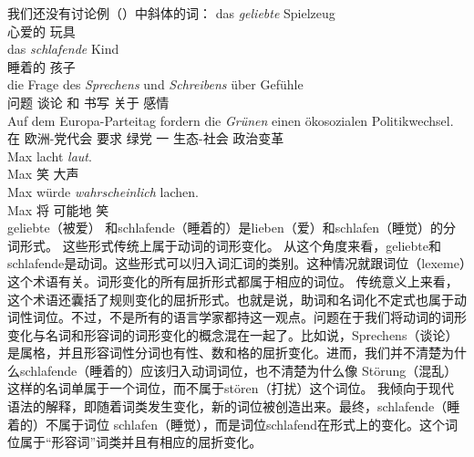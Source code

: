 我们还没有讨论例（）中斜体的词：
\eal
\ex 
\gll das \emph{geliebte} Spielzeug\\
	  心爱的 玩具\\
\ex 
\gll das \emph{schlafende} Kind\\
	  睡着的 孩子\\
\ex 
\gll die Frage des \emph{Sprechens} und \emph{Schreibens} über Gefühle\\
	  问题  谈论 和 书写 关于 感情\\
\ex 
\gll Auf dem Europa-Parteitag fordern die \emph{Grünen} einen ökosozialen Politikwechsel.\\
	 在  欧洲-党代会 要求  绿党 一 生态-社会 政治变革\\
\ex\label{Wortart-adverbiales-Adjektiv} 
\gll Max lacht \emph{laut}.\\
	 Max 笑 大声\\
\ex\label{Wortart-Satzadverb-Adjektiv} 
\gll Max würde \emph{wahrscheinlich} lachen.\\
     Max  将 可能地 笑\\
\zl
geliebte（被爱） 和schlafende（睡着的）是lieben（爱）和schlafen（睡觉）的分词形式。
这些形式传统上属于动词的词形变化。
从这个角度来看，geliebte和schlafende是动词。这些形式可以归入词汇词的类别。这种情况就跟词位（lexeme）这个术语有关。词形变化的所有屈折形式都属于相应的词位。
传统意义上来看，这个术语还囊括了规则变化的屈折形式。也就是说，助词和名词化不定式也属于动词性词位。不过，不是所有的语言学家都持这一观点。问题在于我们将动词的词形变化与名词和形容词的词形变化的概念混在一起了。比如说，Sprechens（谈论）是属格，并且形容词性分词也有性、数和格的屈折变化。进而，我们并不清楚为什么schlafende（睡着的）应该归入动词词位，也不清楚为什么像 Störung（混乱）这样的名词单属于一个词位，而不属于stören（打扰）这个词位。
我倾向于现代语法的解释，即随着词类发生变化，新的词位被创造出来。最终，schlafende（睡着的）不属于词位 schlafen（睡觉），而是词位schlafend在形式上的变化。这个词位属于“形容词”词类并且有相应的屈折变化。
